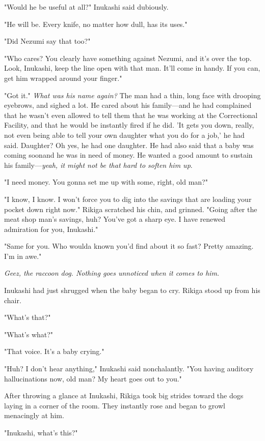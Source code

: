 "Would he be useful at all\el ?" Inukashi said dubiously.

"He will be. Every knife, no matter how dull, has its uses."

"Did Nezumi say that too?"

"Who cares? You clearly have something against Nezumi, and it's over the
top. Look, Inukashi, keep the line open with that man. It'll come in
handy. If you can, get him wrapped around your finger."

"Got it." \emph{What was his name again?} The man had a thin, long face with
drooping eyebrows, and sighed a lot. He cared about his family---and he
had complained that he wasn't even allowed to tell them that he was
working at the Correctional Facility, and that he would be instantly
fired if he did. 'It gets you down, really, not even being able to tell
your own daughter what you do for a job,' he had said. Daughter? Oh yes,
he had one daughter. He had also said that a baby was coming soon\el and
he was in need of money. He wanted a good amount to sustain his
family---\emph{yeah, it might not be that hard to soften him up}.

"I need money. You gonna set me up with some, right, old man?"

"I know, I know. I won't force you to dig into the savings that are
loading your pocket down right now." Rikiga scratched his chin, and
grinned. "Going after the meat shop man's savings, huh? You've got a
sharp eye. I have renewed admiration for you, Inukashi."

"Same for you. Who woulda known you'd find about it so fast? Pretty
amazing. I'm in awe."

\emph{Geez, the raccoon dog. Nothing goes unnoticed when it comes to him.}

Inukashi had just shrugged when the baby began to cry. Rikiga stood up
from his chair.

"What's that?"

"What's what?"

"That voice. It's a baby crying."

"Huh? I don't hear anything," Inukashi said nonchalantly. "You having
auditory hallucinations now, old man? My heart goes out to you."

After throwing a glance at Inukashi, Rikiga took big strides toward the
dogs laying in a corner of the room. They instantly rose and began to
growl menacingly at him.

"Inukashi, what's this?"

